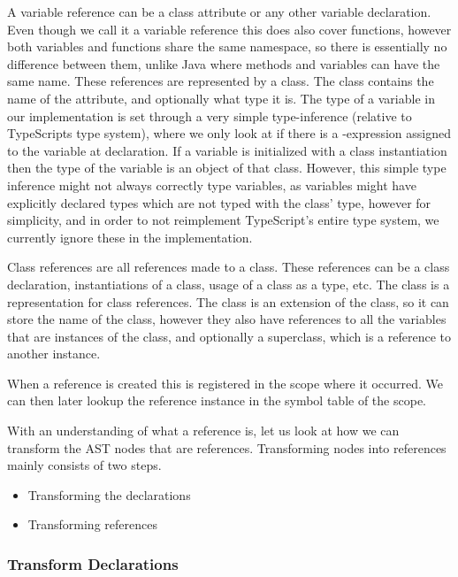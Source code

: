 A variable reference can be a class attribute or any other variable declaration.
Even though we call it a variable reference this does also cover functions, however both variables and functions share the same namespace, so there is essentially no difference between them, unlike Java where methods and variables can have the same name.
These references are represented by a  class.
The class contains the name of the attribute, and optionally what type it is.
The type of a variable in our implementation is set through a very simple type-inference (relative to TypeScripts type system), where we only look at if there is a -expression assigned to the variable at declaration.
If a variable is initialized with a class instantiation then the type of the variable is an object of that class.
However, this simple type inference might not always correctly type variables, as variables might have explicitly declared types which are not typed with the class' type, however for simplicity, and in order to not reimplement TypeScript's entire type system, we currently ignore these in the implementation.

Class references are all references made to a class.
These references can be a class declaration, instantiations of a class, usage of a class as a type, etc.
The  class is a representation for class references.
The class is an extension of the  class, so it can store the name of the class, however they also have references to all the variables that are instances of the class, and optionally a superclass, which is a reference to another  instance.

When a reference is created this is registered in the scope where it occurred.
We can then later lookup the reference instance in the symbol table of the scope.

With an understanding of what a reference is, let us look at how we can transform the AST nodes that are references.
Transforming nodes into references mainly consists of two steps.

\begin{itemize}
    \item Transforming the declarations
    \item Transforming references
\end{itemize}

\subsubsection{Transform Declarations}

